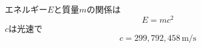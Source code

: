 \documentclass[dvipdfmx]{jsarticle}
\begin{document}
エネルギー$E$と質量$m$の関係は
\begin{equation}
  E = mc^{2}
\end{equation}
$c$は光速で
\begin{equation}
  c = 299{,}792{,}458 \, \mathrm{m/s}
\end{equation}
\end{document}
